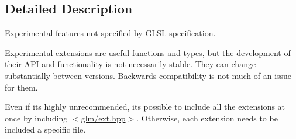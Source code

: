 \subsection{Detailed Description}
Experimental features not specified by G\+L\+SL specification. 

Experimental extensions are useful functions and types, but the development of their A\+PI and functionality is not necessarily stable. They can change substantially between versions. Backwards compatibility is not much of an issue for them.

Even if it\textquotesingle{}s highly unrecommended, it\textquotesingle{}s possible to include all the extensions at once by including $<$\mbox{\hyperlink{ext_8hpp}{glm/ext.\+hpp}}$>$. Otherwise, each extension needs to be included a specific file. 